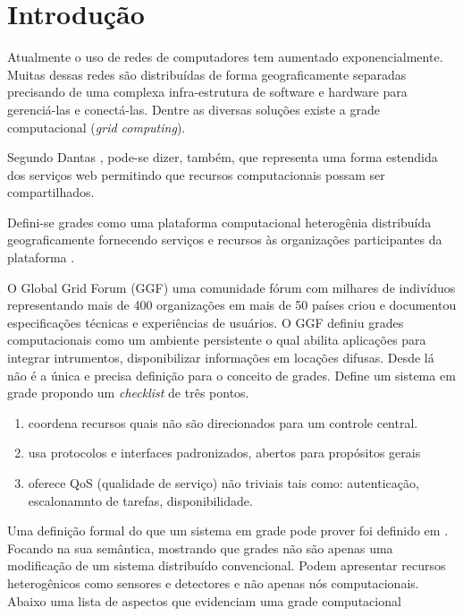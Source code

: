 \section*{Introdução}
\label{cap:introducao}

Atualmente o uso de redes de computadores tem aumentado exponencialmente. Muitas dessas redes são distribuídas de forma geograficamente separadas precisando de uma complexa infra-estrutura de software e hardware para gerenciá-las e conectá-las. Dentre as diversas soluções existe a grade computacional (\emph{grid computing}).

Segundo Dantas \cite{Mangan2006}, pode-se dizer, também, que representa uma forma estendida dos serviços web permitindo que recursos computacionais possam ser compartilhados.

Defini-se grades como uma plataforma computacional heterogênia distribuída geograficamente fornecendo serviços e recursos às organizações participantes da plataforma \cite{Mangan2006}.

\cite[apud]{Mangan2006} O Global Grid Forum (GGF) uma comunidade fórum com milhares de indivíduos representando mais de 400 organizações em mais de 50 países criou e documentou especificações técnicas e experiências de usuários. O GGF definiu grades computacionais como um ambiente persistente o qual abilita aplicações para integrar intrumentos, disponibilizar informações em locações difusas. Desde lá não é a única e precisa definição para o conceito de grades. \cite{Kesselman2001} Define um sistema em grade propondo um \emph{checklist} de três pontos.

\begin{enumerate}
	\item coordena recursos quais não são direcionados para um controle central.
	\item usa protocolos e interfaces padronizados, abertos para propósitos gerais
	\item oferece QoS (qualidade de serviço) não triviais tais como: autenticação, escalonamnto de tarefas, disponibilidade.
\end{enumerate}

Uma definição formal do que um sistema em grade pode prover foi definido em \cite{Mangan2006}. Focando na sua semântica, mostrando que grades não são apenas uma modificação de um sistema distribuído convencional. Podem apresentar recursos heterogênicos como sensores e detectores e não apenas nós computacionais. Abaixo uma lista de aspectos que evidenciam uma grade computacional \cite{Cirne2002}

